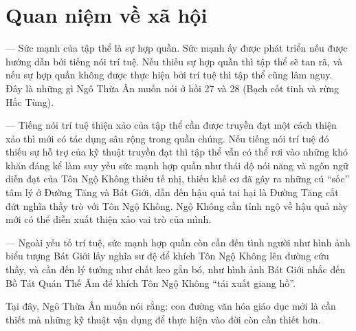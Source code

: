 \section{Quan niệm về xã hội} %
\label{sec:27_28_xa_hoi}

— Sức mạnh của tập thể là sự hợp quần. Sức mạnh ấy được phát triển nếu được hướng dẫn bởi tiếng nói trí tuệ. Nếu thiếu sự hợp quần thì tập thể sẽ tan rã, và nếu sự hợp quần không được thực hiện bởi trí tuệ thì tập thể cũng lâm nguy. Đây là những gì Ngô Thừa Ân muốn nói ở hồi 27 và 28 (Bạch cốt tinh và rừng Hắc Tùng).

— Tiếng nói trí tuệ thiện xảo của tập thể cần được truyền đạt một cách thiện xảo thì mới có tác dụng sâu rộng trong quần chúng. Nếu tiếng nói trí tuệ đó thiếu sự hỗ trợ của kỹ thuật truyền đạt thì tập thể vẫn có thể rơi vào những khó khăn đáng kể làm suy yếu sức mạnh hợp quần như thái độ nói năng và ngôn ngữ diễn đạt của Tôn Ngộ Không thiếu tế nhị, thiếu khế cơ đã gây ra những cú ``sốc'' tâm lý ở Đường Tăng và Bát Giới, dẫn đến hậu quả tai hại là Đường Tăng cắt đứt nghĩa thầy trò với Tôn Ngộ Không. Ngộ Không cần tỉnh ngộ về hậu quả này mới có thể diễn xuất thiện xảo vai trò của mình.

— Ngoài yếu tố trí tuệ, sức mạnh hợp quần còn cần đến tình người như hình ảnh biểu tượng Bát Giới lấy nghĩa sư đệ để khích Tôn Ngộ Không lên đường cứu thầy, và cần đến lý tưởng như chất keo gắn bó, như hình ảnh Bát Giới nhắc đến Bồ Tát Quán Thế Âm để khích Tôn Ngộ Không ``tái xuất giang hồ''.

Tại đây, Ngô Thừa Ân muốn nói rằng: con đường văn hóa giáo dục mới là cần thiết mà những kỹ thuật vận dụng để thực hiện vào đời còn cần thiết hơn.
